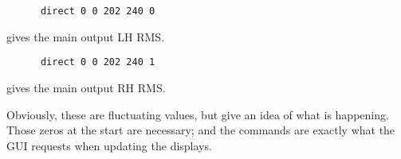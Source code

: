    \begin{verbatim}
      direct 0 0 202 240 0
   \end{verbatim}

gives the main output LH RMS.

   \begin{verbatim}
      direct 0 0 202 240 1
   \end{verbatim}

gives the main output RH RMS.

   Obviously, these are fluctuating values, but give an idea of what is
   happening.  Those zeros at the start are necessary; and the commands are
   exactly what the GUI requests when updating the displays.

